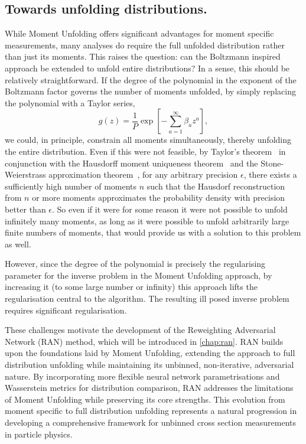     \subsection{Towards unfolding distributions.}
        While Moment Unfolding offers significant advantages for moment specific measurements, many analyses do require the full unfolded distribution rather than just its moments.
        This raises the question: can the Boltzmann inspired approach be extended to unfold entire distributions?
        In a sense, this should be relatively straightforward.
        If the degree of the polynomial in the exponent of the Boltzmann factor governs the number of moments unfolded, by simply replacing the polynomial with a Taylor series,
        \[
            g(z) = \frac{1}{P}\exp\left[-\sum_{a=1}^{\infty}\beta_a z^a\right],
        \]
        we could, in principle, constrain all moments simultaneously, thereby unfolding the entire distribution.
        Even if this were not feasible, by Taylor's theorem~\cite{taylor_methodus_1715} in conjunction with the Hausdorff moment uniqueness theorem~\cite{Hausdorff1921} and the Stone-Weierstrass approximation theorem~\cite{weierstras_uber_1885, pani_generalized_2024}, for any arbitrary precision \(\epsilon\), there exists a sufficiently high number of moments \(n\) such that the Hausdorf reconstruction from \(n\) or more moments approximates the probability density with precision better than \(\epsilon.\)
        So even if it were for some reason it were not possible to unfold infinitely many moments, as long as it were possible to unfold arbitrarily large finite numbers of moments, that would provide us with a solution to this problem as well.
        
        However, since the degree of the polynomial is precisely the regularising parameter for the inverse problem in the Moment Unfolding approach, by increasing it (to some large number or infinity) this approach lifts the regularisation central to the algorithm.
        The resulting ill posed inverse problem requires significant regularisation.

        These challenges motivate the development of the Reweighting Adversarial Network (RAN) method, which will be introduced in \cref{chap:ran}.
        RAN builds upon the foundations laid by Moment Unfolding, extending the approach to full distribution unfolding while maintaining its unbinned, non-iterative, adversarial nature.
        By incorporating more flexible neural network parametrisations and Wasserstein metrics for distribution comparison, RAN addresses the limitations of Moment Unfolding while preserving its core strengths.
        This evolution from moment specific to full distribution unfolding represents a natural progression in developing a comprehensive framework for unbinned cross section measurements in particle physics.